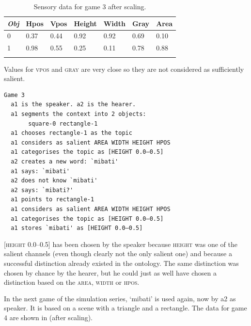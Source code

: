 \begin{table}
\begin{center}
\begin{tabular}{ l  l  l  l  l  l  l }
\lsptoprule
{\itshape Obj} & Hpos & Vpos & Height & Width & Gray & Area \\ \midrule
0 & 0.37 & 0.44 & 0.92 & 0.92 & 0.69 & 0.10\\ 
1 & 0.98 & 0.55 & 0.25 & 0.11 & 0.78 & 0.88\\ 
\lspbottomrule
\end{tabular}
\caption{\label{tab:game3}Sensory data for game 3 after scaling.}
\end{center}
\end{table}
Values for \textsc{vpos} and \textsc{gray} are very close so they are not 
considered as sufficiently salient.
\begin{verbatim}
Game 3
  a1 is the speaker. a2 is the hearer. 
  a1 segments the context into 2 objects: 
       square-0 rectangle-1 
  a1 chooses rectangle-1 as the topic 
  a1 considers as salient AREA WIDTH HEIGHT HPOS 
  a1 categorises the topic as [HEIGHT 0.0–0.5]
  a2 creates a new word: `mibati'
  a1 says: `mibati'
  a2 does not know `mibati'
  a2 says: `mibati?'
  a1 points to rectangle-1
  a1 considers as salient AREA WIDTH HEIGHT HPOS 
  a1 categorises the topic as [HEIGHT 0.0–0.5]
  a1 stores `mibati' as [HEIGHT 0.0–0.5]
\end{verbatim}
{}[\textsc{height} 0.0–0.5] has been chosen by the speaker
because \textsc{height} was one of the salient channels (even 
though clearly not the only salient one) and 
because a successful distinction already existed in 
the ontology. The same 
distinction was chosen by chance by the hearer, but he 
could just as well have chosen a distinction based on 
the \textsc{area}, \textsc{width} or \textsc{hpos}. 

In the next game of the simulation series, `mibati'
is used again, now by {\bfshape  a2} as speaker. It is 
based on a scene with a triangle and a rectangle.
The data for game 4 are shown in  (after scaling).  


